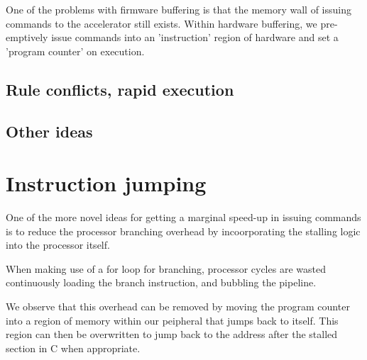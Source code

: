 \documentclass[a4paper,8pt]{report}
\begin{document}
One of the problems with firmware buffering is that the memory wall of issuing
commands to the accelerator still exists. Within hardware buffering, we
pre-emptively issue commands into an 'instruction' region of hardware and set
a 'program counter' on execution. 





\subsection{Rule conflicts, rapid execution}



\subsection{Other ideas}


\section{Instruction jumping}
One of the more novel ideas for getting a marginal speed-up in issuing commands
is to reduce the processor branching overhead by incoorporating the stalling
logic into the processor itself.

When making use of a for loop for branching, processor cycles are wasted
continuously loading the branch instruction, and bubbling the pipeline.

We observe that this overhead can be removed by moving the program counter into
a region of memory within our peipheral that jumps back to itself. This region
can then be overwritten to jump back to the address after the stalled section in
C when appropriate.
\end{document}
